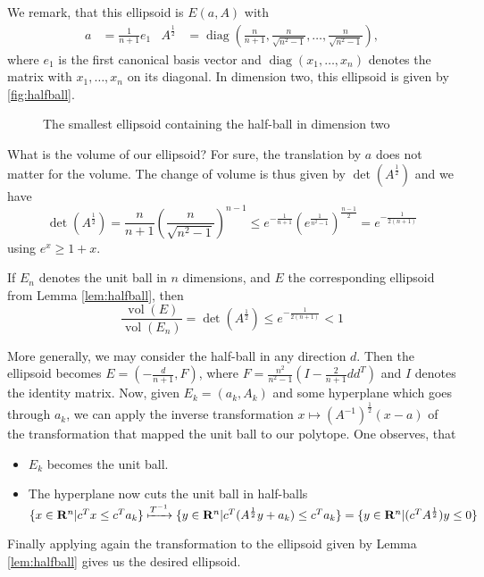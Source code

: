 \documentclass[10pt]{article}
\newcommand{\R}{\mathbf{R}}
\newcommand{\transpose}{T}
\newcommand{\diag}{\operatorname{diag}}
\newcommand{\vol}{\operatorname{vol}}
\begin{document}
We remark, that this ellipsoid is $E(a,A)$ with
\begin{align*}
a &= \frac{1}{n+1} e_1 &  A^{\frac{1}{2}}&= \diag \left(\frac{n}{n+1}, \frac{n}{\sqrt{n^2-1}}, \dots, \frac{n}{\sqrt{n^2-1}}\right),
\end{align*}
where $e_1$ is the first canonical basis vector and $\diag (x_1, \dots, x_n)$ denotes the matrix with $x_1, \dots, x_n$ on its diagonal. In dimension two, this ellipsoid is given by \autoref{fig:halfball}.
\begin{figure}
\centering
{}
\caption{The smallest ellipsoid containing the half-ball in dimension two}
\label{fig:halfball}
\end{figure}
What is the volume of our ellipsoid? For sure, the translation by $a$ does not matter for the volume. The change of volume is thus given by $\det (A^{\frac{1}{2}})$ and we have
\[
\det (A^{\frac{1}{2}}) = \frac{n}{n+1} (\frac{n}{\sqrt{n^2-1}})^{n-1} \le e^{-\frac{1}{n+1}} (e^{\frac{1}{n^2-1}})^{\frac{n-1}{2}} = e^{-\frac{1}{2(n+1)}}
\]
using $e^x \geq 1 + x$.
\begin{corollary}
If $E_n$ denotes the unit ball in $n$ dimensions, and $E$ the corresponding ellipsoid from Lemma \ref{lem:halfball}, then
\[
\frac{\vol (E)}{\vol (E_n)} = \det (A^{\frac{1}{2}}) \le e^{-\frac{1}{2(n+1)}}<1
\]
\end{corollary}
More generally, we may consider the half-ball in any direction $d$. Then the ellipsoid becomes $E = (-\frac{d}{n+1}, F)$, where $F = \frac{n^2}{n^2-1} (I - \frac{2}{n+1} dd^\transpose)$ and $I$ denotes the identity matrix. Now, given $E_k = (a_k, A_k)$ and some hyperplane which goes through $a_k$, we can apply the inverse transformation $x \mapsto (A^{-1})^{\frac{1}{2}} (x-a)$ of the transformation that mapped the unit ball to our polytope. One observes, that
\begin{itemize}
\item $E_k$ becomes the unit ball. 
\item The hyperplane now cuts the unit ball in half-balls $\{x\in \R^n | c^\transpose x \le c^\transpose a_k \} \xmapsto{T^{-1}} \{y\in \R^n | c^\transpose (A^{\frac{1}{2}} y + a_k ) \le c^\transpose a_k\} = \{y \in \R^n | (c^\transpose A^{\frac{1}{2}}) y \le 0 \}$
\end{itemize}
Finally applying again the transformation to the ellipsoid given by Lemma \ref{lem:halfball} gives us the desired ellipsoid.
\end{document}
